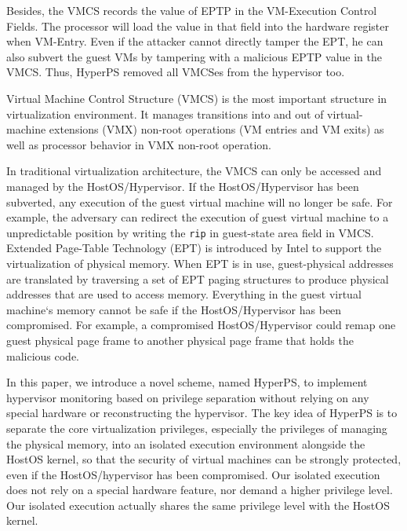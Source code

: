 Besides, the VMCS records the value of EPTP in the VM-Execution Control Fields. The processor will load the value in that field into the hardware register when VM-Entry. 
Even if the attacker cannot directly tamper the EPT, he can also subvert the guest VMs by tampering with a malicious EPTP value in the VMCS. Thus, HyperPS removed all VMCSes from the hypervisor too. 

Virtual Machine Control Structure (VMCS) is the most important structure in virtualization environment. It manages transitions into and out of virtual-machine extensions (VMX) non-root operations (VM entries and VM exits) as well as processor behavior in VMX non-root operation. 

In traditional virtualization architecture, the VMCS can only be accessed and managed by the HostOS/Hypervisor.
If the HostOS/Hypervisor has been subverted, any execution of the guest virtual machine will no longer be safe. For example, the adversary can redirect the execution of guest virtual machine to a unpredictable position by writing the \verb|rip| in guest-state area field in VMCS.
Extended Page-Table Technology (EPT) is introduced by Intel to support the virtualization of physical memory.
When EPT is in use, guest-physical addresses are translated by traversing a set of EPT paging structures to produce physical addresses that are used to access memory. Everything in the guest virtual machine`s memory cannot be safe if the HostOS/Hypervisor has been compromised. For example, a compromised HostOS/Hypervisor could remap one guest physical page frame to another physical page frame that holds the malicious code.
\fi

In this paper, we introduce a novel scheme, named HyperPS, to implement hypervisor monitoring based on privilege separation without relying on any special hardware or reconstructing the hypervisor. The key idea of HyperPS is to separate the core virtualization privileges, especially the privileges of managing the physical memory, into an isolated execution environment alongside the HostOS kernel,
so that the security of virtual machines can be strongly protected, even if the HostOS/hypervisor has been compromised. Our isolated execution does not rely on a special hardware feature, nor demand a higher privilege level. Our isolated execution actually shares the same privilege level with the HostOS kernel. 





